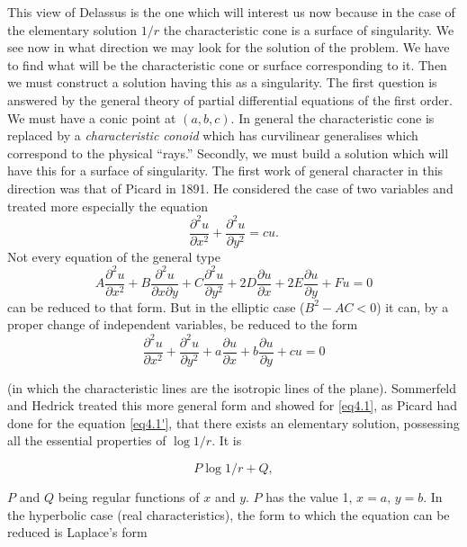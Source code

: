\documentclass[12pt,oneside]{book}
\begin{document}
This view of Delassus is the one which will interest us now because in the case
of the elementary solution $1/r$ the characteristic cone is a surface of
singularity. We see now in what direction we may look for the solution of the
problem. We have to find what will be the characteristic cone or surface
corresponding to it. Then we must construct a solution having this as a
singularity. The first question is answered by the general theory of partial
differential equations of the first order. We must have a conic point at
$(a,b,c)$. In general the characteristic cone is replaced by a
\textit{characteristic conoid} which has curvilinear generalises which
correspond to the physical ``rays.'' Secondly, we must build a solution which
will have this for a surface of singularity. The first work of general character
in this direction was that of Picard in 1891. He considered the case of two
variables and treated more especially the equation
\begin{equation}
    \tag{4.1'}
    \label{eq4.1'}
    \frac{\partial^2 u}{\partial x^2}+\frac{\partial^2u}{\partial y^2}=cu.
\end{equation}
Not every equation of the general type
\begin{equation*}
    A\frac{\partial^2u}{\partial x^2}+B\frac{\partial^2u}{\partial x\partial y}+C\frac{\partial^2u}{\partial y^2}+2D\frac{\partial u}{\partial x}+2E\frac{\partial u}{\partial y}+Fu=0
\end{equation*}
can be reduced to that form. But in the elliptic case ($B^2-AC<0$) it can, by a
proper change of independent variables, be reduced to the form
\begin{equation}
    \frac{\partial^2u}{\partial x^2}+\frac{\partial^2u}{\partial y^2}+a\frac{\partial u}{\partial x}+b\frac{\partial u}{\partial y}+cu=0
    \label{eq4.1}
\end{equation}

(in which the characteristic lines are the isotropic lines of the plane).
Sommerfeld and Hedrick treated this more general form and showed for
\eqref{eq4.1}, as Picard had done for the equation \eqref{eq4.1'}, that there
exists an elementary solution, possessing all the essential properties of $\log
1/r$. It is

$$ P\log 1/r+Q,$$

$P$ and $Q$ being regular functions of $x$ and $y$. $P$ has the value 1, $x=a,\,
y=b$. In the hyperbolic case (real characteristics), the form to which the
equation can be reduced is Laplace's form
\end{document}
